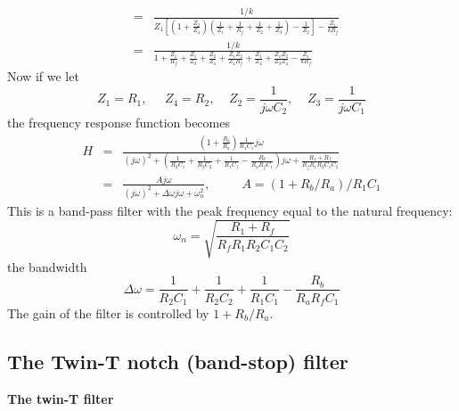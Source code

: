 \documentclass{article}
\begin{document}
\begin{itemize}
\begin{eqnarray}
    &=&
    \frac{1/k}{Z_1\left[\left(1+\frac{Z_2}{Z_4}\right)\left(\frac{1}{Z_1}+\frac{1}{R_f}+\frac{1}{Z_2}+\frac{1}{Z_3}\right)-\frac{1}{Z_2}\right]-\frac{Z_1}{kR_f}}
    \nonumber \\
    &=&
    \frac{1/k}{1+\frac{Z_1}{R_f}+\frac{Z_1}{Z_3}+\frac{Z_2}{Z_4}+\frac{Z_1Z_2}{Z_4R_f}+\frac{Z_1}{Z_4}+\frac{Z_1Z_2}{Z_3Z_4}-\frac{Z_1}{kR_f}}
  \end{eqnarray}
  Now if we let
  \begin{equation}
  Z_1=R_1,\;\;\;\;\;Z_4=R_2,\;\;\;\;Z_2=\frac{1}{j\omega C_2},
  \;\;\;\;Z_3=\frac{1}{j\omega C_1}
  \end{equation}
  the frequency response function becomes
  \begin{eqnarray}
  H&=&\frac{\left(1+\frac{R_b}{R_a}\right)\frac{1}{R_1C_1}j\omega}{(j\omega)^2+\left(\frac{1}{R_2C_1}+\frac{1}{R_2C_2}+\frac{1}{R_1C_1}-\frac{R_b}{R_aR_fC_1}\right)j\omega+\frac{R_1+R_f}{R_fR_1R_2C_1C_2}}
  \nonumber\\
  &=&\frac{Aj\omega}{(j\omega)^2+\Delta\omega j\omega+\omega_n^2},
  \;\;\;\;\;\;\;\;\;
  A=(1+R_b/R_a)/R_1C_1
  \end{eqnarray}
  This is a band-pass filter with the peak frequency equal to the natural
  frequency:
  \begin{equation}
  \omega_n=\sqrt{\frac{R_1+R_f}{R_fR_1R_2C_1C_2}}
  \end{equation}
  the bandwidth
  \begin{equation}
  \Delta\omega=\frac{1}{R_2C_1}+\frac{1}{R_2C_2}+\frac{1}{R_1C_1}-\frac{R_b}{R_aR_fC_1}
  \end{equation}
  The gain of the filter is controlled by $1+R_b/R_a$.
  
\end{itemize}


\subsection{The Twin-T notch (band-stop) filter}

{\bf The twin-T filter}

\end{document}
